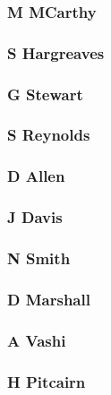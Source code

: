\documentclass[letterpaper,10pt,english]{sphinxmanual}
\begin{document}
\subsubsection{M MCarthy}
\label{\detokenize{investors:m-mcarthy}}

\subsubsection{S Hargreaves}
\label{\detokenize{investors:s-hargreaves}}

\subsubsection{G Stewart}
\label{\detokenize{investors:g-stewart}}

\subsubsection{S Reynolds}
\label{\detokenize{investors:s-reynolds}}

\subsubsection{D Allen}
\label{\detokenize{investors:d-allen}}

\subsubsection{J Davis}
\label{\detokenize{investors:j-davis}}

\subsubsection{N Smith}
\label{\detokenize{investors:n-smith}}

\subsubsection{D Marshall}
\label{\detokenize{investors:d-marshall}}

\subsubsection{A Vashi}
\label{\detokenize{investors:a-vashi}}

\subsubsection{H Pitcairn}
\label{\detokenize{investors:h-pitcairn}}
\end{document}
